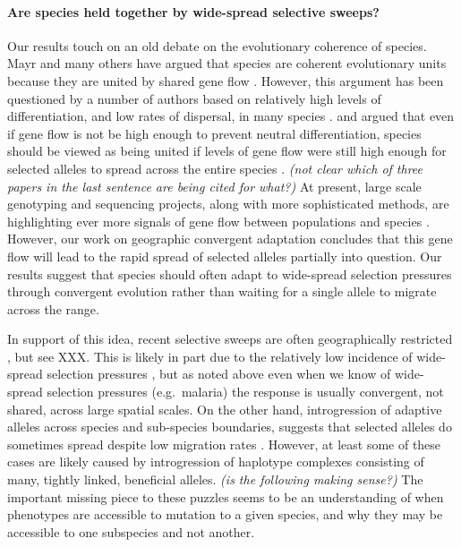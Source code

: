 \documentclass{article}
\newcommand{\plr}[1]{{\it\color{blue}(#1)}}
\begin{document}
\paragraph{Are species held together by wide-spread selective sweeps?}
Our results touch on an old debate on the evolutionary coherence of species. 
Mayr and many others have argued that species are coherent
evolutionary units because they are united by shared gene flow \citep[pages 521–522 ][]{Mayr:SpeciesEvol}. 
However, this argument has been questioned by a number of authors 
based on relatively high levels of differentiation, and low rates of dispersal, in many species \citep{EhrlichRaven:69,Levin:79}.
\citet{Rieseberg2001} and \citet{MorjanRieseberg:04} argued that 
even if gene flow is not be high enough to prevent neutral differentiation, 
species should be viewed as being united 
if levels of gene flow were still high enough for selected alleles to spread across the entire species \citep{Ellstrand2014s}.
\plr{not clear which of three papers in the last sentence are being cited for what?}
At present, large scale genotyping and sequencing projects, 
along with more sophisticated methods, 
are highlighting ever more signals of gene flow between populations and species \citep{}.
However, our work on geographic convergent adaptation
\citep[see also][]{ralph2010parallel,RalphCoop:14} 
concludes that this gene flow will lead to the rapid spread of
selected alleles partially into question. 
Our results suggest that species should often adapt to
wide-spread selection pressures through convergent evolution rather
than waiting for a single allele to migrate across the range.
 
In support of this idea, recent selective sweeps are often
geographically restricted \citep{}, but see XXX. 
This is likely in part due to the relatively low incidence of wide-spread selection pressures \citep{},
but as noted above even when we know of wide-spread selection
pressures (e.g.\ malaria) the response is usually convergent, not shared, across large spatial scales. 
On the other hand, 
introgression of adaptive alleles across species and sub-species boundaries, 
suggests that selected alleles do sometimes spread despite low migration rates \citep{hedrick2013adaptive}.
However, at least some of these cases 
are likely caused by introgression of haplotype complexes
consisting of many, tightly linked, beneficial alleles.  
\plr{is the following making sense?}
The important missing piece to these puzzles seems to be an understanding
of when phenotypes are accessible to mutation to a given species,
and why they may be accessible to one subspecies and not another.
\end{document}
